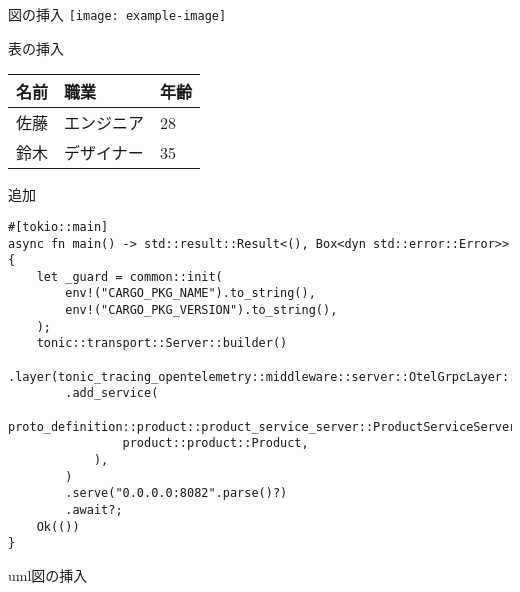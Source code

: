 \documentclass[aspectratio=169]{beamer}
\begin{document}
\begin{frame}{図の挿入}
    \texttt{[image: example-image]}
\end{frame}

\begin{frame}{表の挿入}
    \begin{tabular}{lll}
        \toprule
        名前 & 職業    & 年齢 \\
        \midrule
        佐藤 & エンジニア & 28 \\
        鈴木 & デザイナー & 35 \\
        \bottomrule
    \end{tabular}
\end{frame}

\begin{frame}[fragile]{追加}
    \begin{lstlisting}
#[tokio::main]
async fn main() -> std::result::Result<(), Box<dyn std::error::Error>> {
    let _guard = common::init(
        env!("CARGO_PKG_NAME").to_string(),
        env!("CARGO_PKG_VERSION").to_string(),
    );
    tonic::transport::Server::builder()
        .layer(tonic_tracing_opentelemetry::middleware::server::OtelGrpcLayer::default())
        .add_service(
            proto_definition::product::product_service_server::ProductServiceServer::new(
                product::product::Product,
            ),
        )
        .serve("0.0.0.0:8082".parse()?)
        .await?;
    Ok(())
}
    \end{lstlisting}
\end{frame}

\begin{frame}[fragile]{uml図の挿入}
\end{frame}
\end{document}
